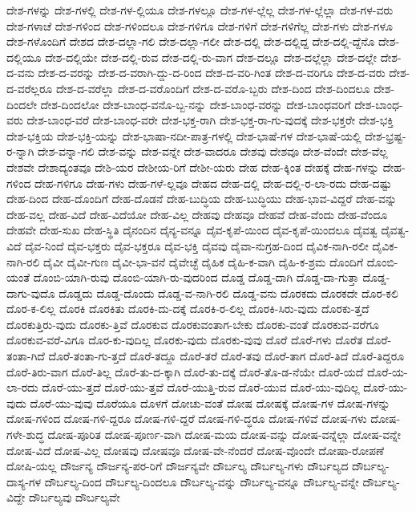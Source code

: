 {ದೇಶ-ಗಳನ್ನು
ದೇಶ-ಗಳಲ್ಲಿ
ದೇಶ-ಗಳ-ಲ್ಲಿಯೂ
ದೇಶ-ಗಳಲ್ಲೂ
ದೇಶ-ಗಳ-ಲ್ಲೆಲ್ಲ
ದೇಶ-ಗಳ-ಲ್ಲೆಲ್ಲಾ
ದೇಶ-ಗಳ-ವರು
ದೇಶ-ಗಳಾಚೆ
ದೇಶ-ಗಳಿಂದ
ದೇಶ-ಗಳಿಂದಲೂ
ದೇಶ-ಗಳಿಗೂ
ದೇಶ-ಗಳಿಗೆ
ದೇಶ-ಗಳಿಗೆಲ್ಲ
ದೇಶ-ಗಳು
ದೇಶ-ಗಳೂ
ದೇಶ-ಗಳೊಂದಿಗೆ
ದೇಶದ
ದೇಶ-ದಲ್ಲಾ-ಗಲಿ
ದೇಶ-ದಲ್ಲಾ-ಗಲೀ
ದೇಶ-ದಲ್ಲಿ
ದೇಶ-ದಲ್ಲಿದ್ದ
ದೇಶ-ದಲ್ಲಿ-ದ್ದೆನೊ
ದೇಶ-ದಲ್ಲಿಯೂ
ದೇಶ-ದಲ್ಲಿಯೇ
ದೇಶ-ದಲ್ಲಿ-ರುವ
ದೇಶ-ದಲ್ಲಿ-ರು-ವಾಗ
ದೇಶ-ದಲ್ಲೂ
ದೇಶ-ದಲ್ಲೆಲ್ಲಾ
ದೇಶ-ದಲ್ಲೇ
ದೇಶ-ದ-ವನು
ದೇಶ-ದ-ವರನ್ನು
ದೇಶ-ದ-ವರಾಗಿ-ದ್ದು-ದ-ರಿಂದ
ದೇಶ-ದ-ವರಿ-ಗಿಂತ
ದೇಶ-ದ-ವರಿಗೂ
ದೇಶ-ದ-ವರು
ದೇಶ-ದ-ವರೆಲ್ಲರೂ
ದೇಶ-ದ-ವರೆಲ್ಲಾ
ದೇಶ-ದ-ವರೊಂದಿಗೆ
ದೇಶ-ದ-ವರೊ-ಬ್ಬರು
ದೇಶ-ದಿಂದ
ದೇಶ-ದಿಂದಲೂ
ದೇಶ-ದಿಂದಲೇ
ದೇಶ-ದಿಂದಲೋ
ದೇಶ-ಬಾಂಧ-ವನೊ-ಬ್ಬ-ನನ್ನು
ದೇಶ-ಬಾಂಧ-ವರನ್ನು
ದೇಶ-ಬಾಂಧವರಿಗೆ
ದೇಶ-ಬಾಂಧ-ವರು
ದೇಶ-ಬಾಂಧ-ವರೆ
ದೇಶ-ಬಾಂಧ-ವರೇ
ದೇಶ-ಭಕ್ತ-ರಾಗಿ
ದೇಶ-ಭಕ್ತ-ರಾ-ಗು-ವುದಕ್ಕೆ
ದೇಶ-ಭಕ್ತರೇ
ದೇಶ-ಭಕ್ತಿ
ದೇಶ-ಭಕ್ತಿಯ
ದೇಶ-ಭಕ್ತಿ-ಯನ್ನು
ದೇಶ-ಭಾಷಾ-ನದೀ-ಪಾತ್ರ-ಗಳಲ್ಲಿ
ದೇಶ-ಭಾಷೆ-ಗಳ
ದೇಶ-ಭಾಷೆ-ಯಲ್ಲಿ
ದೇಶ-ಭ್ರಷ್ಟ-ರ-ನ್ನಾಗಿ
ದೇಶ-ವನ್ನಾ-ಗಲಿ
ದೇಶ-ವನ್ನು
ದೇಶ-ವನ್ನೇ
ದೇಶ-ವಾದರೂ
ದೇಶವು
ದೇಶವೂ
ದೇಶ-ವೆಂದೇ
ದೇಶ-ವೆಲ್ಲ
ದೇಶವೇ
ದೇಶಾದ್ಯಂತವೂ
ದೇಶಿ-ಯರ
ದೇಶೀಯ-ರಿಗೆ
ದೇಶೀ-ಯರು
ದೇಹ
ದೇಹ-ಕ್ಕಿಂತ
ದೇಹಕ್ಕೆ
ದೇಹ-ಗಳನ್ನು
ದೇಹ-ಗಳಿಂದ
ದೇಹ-ಗಳಿಗೂ
ದೇಹ-ಗಳು
ದೇಹ-ಗಳೆ-ಲ್ಲವೂ
ದೇಹದ
ದೇಹ-ದಲ್ಲಿ
ದೇಹ-ದಲ್ಲಿ-ರ-ಲಾ-ರದು
ದೇಹ-ದಷ್ಟು
ದೇಹ-ದಿಂದ
ದೇಹ-ದೊಂದಿಗೆ
ದೇಹ-ದೊಡನೆ
ದೇಹ-ಬುದ್ಧಿಯ
ದೇಹ-ಬುದ್ಧಿಯು
ದೇಹ-ಭಾವ-ವಿದ್ದರೆ
ದೇಹ-ವನ್ನು
ದೇಹ-ವಲ್ಲ
ದೇಹ-ವಿದೆ
ದೇಹ-ವಿದೆಯೋ
ದೇಹ-ವಿಲ್ಲ
ದೇಹವು
ದೇಹವೂ
ದೇಹವೆ
ದೇಹ-ವೆಂದು
ದೇಹ-ವೆಂದೂ
ದೇಹವೇ
ದೇಹ-ಸುಖ
ದೇಹ-ಸ್ಥಿತಿ
ದೈನಂದಿನ
ದೈನ್ಯ-ವನ್ನೂ
ದೈವ-ಕೃಪೆ-ಯಿಂದ
ದೈವ-ಕೃಪೆ-ಯಿಂದಲೂ
ದೈವತ್ವ
ದೈವತ್ವ-ವಿದೆ
ದೈವ-ನಿಂದೆ
ದೈವ-ಭಕ್ತರು
ದೈವ-ಭಕ್ತರೂ
ದೈವ-ಭಕ್ತಿ
ದೈವವು
ದೈವಾ-ನುಗ್ರಹ-ದಿಂದ
ದೈವಿಕ-ನಾಗಿ-ರಲೀ
ದೈವಿಕ-ನಾಗಿ-ರಲಿ
ದೈವೀ
ದೈವೀ-ಗುಣ
ದೈವೀ-ಭಾ-ವನೆ
ದೈವೇಚ್ಛೆ
ದೈಹಿಕ
ದೈಹಿ-ಕ-ವಾಗಿ
ದೈಹಿ-ಕ-ಶ್ರಮ
ದೊಂದಿಗೆ
ದೊಂಬಿ-ಯಂತೆ
ದೊಂಬಿ-ಯಾಗಿ-ರುವು
ದೊಂಬಿ-ಯಾಗಿ-ರು-ವುದರಿಂದ
ದೊಡ್ಡ
ದೊಡ್ಡ-ದಾಗಿ
ದೊಡ್ಡ-ದಾ-ಗುತ್ತಾ
ದೊಡ್ಡ-ದಾಗು-ವುದೊ
ದೊಡ್ಡದು
ದೊಡ್ಡ-ದೊಂದು
ದೊಡ್ಡ-ವ-ನಾಗಿ-ರಲಿ
ದೊಡ್ಡ-ವನು
ದೊರಕದು
ದೊರಕದೇ
ದೊರ-ಕಲಿ
ದೊರ-ಕ-ಲಿಲ್ಲ
ದೊರಕಿ
ದೊರಕಿತು
ದೊರಕಿ-ದು-ದಕ್ಕೆ
ದೊರಕಿ-ರ-ಲಿಲ್ಲ
ದೊರಕಿ-ಸಿರು-ವುದು
ದೊರಕು-ತ್ತದೆ
ದೊರಕುತ್ತಿರು-ವುದು
ದೊರಕು-ತ್ತಿವೆ
ದೊರಕುವ
ದೊರಕುವಂತಾಗ-ಬೇಕು
ದೊರಕು-ವಂತೆ
ದೊರಕುವ-ವರೆಗೂ
ದೊರಕುವ-ವರೆ-ವಿಗೂ
ದೊರ-ಕು-ವುದಿಲ್ಲ
ದೊರಕು-ವುದು
ದೊರಕು-ವುವು
ದೊರೆ
ದೊರೆ-ಗಳು
ದೊರೆತ
ದೊರೆ-ತಂತಾ-ಗಿದೆ
ದೊರೆ-ತಂತಾ-ಗು-ತ್ತದೆ
ದೊರೆ-ತದ್ದೂ
ದೊರೆ-ತರೆ
ದೊರೆ-ತವು
ದೊರೆ-ತಾಗ
ದೊರೆ-ತಿದೆ
ದೊರೆ-ತಿದ್ದರೂ
ದೊರೆ-ತಿರು-ವಾಗ
ದೊರೆ-ತಿಲ್ಲ
ದೊರೆ-ತು-ದ-ಕ್ಕಾಗಿ
ದೊರೆ-ತು-ದಕ್ಕೆ
ದೊರೆ-ತೊ-ಡ-ನೆಯೇ
ದೊರೆ-ಯದೆ
ದೊರೆ-ಯ-ಲಾ-ರದು
ದೊರೆ-ಯು-ತ್ತದೆ
ದೊರೆ-ಯು-ತ್ತವೆ
ದೊರೆ-ಯುತ್ತಿ-ರುವ
ದೊರೆ-ಯುವ
ದೊರೆ-ಯು-ವುದಿಲ್ಲ
ದೊರೆ-ಯು-ವುದು
ದೊರೆ-ಯು-ವುವು
ದೊರೆಯೂ
ದೊಳಗೆ
ದೋಚು-ವಂತೆ
ದೋಷ
ದೋಷಕ್ಕೆ
ದೋಷ-ಗಳ
ದೋಷ-ಗಳನ್ನು
ದೋಷ-ಗಳಿಂದ
ದೋಷ-ಗಳಿ-ದ್ದರೂ
ದೋಷ-ಗಳಿ-ದ್ದರೆ
ದೋಷ-ಗಳಿ-ದ್ಧರೂ
ದೋಷ-ಗಳಿವೆ
ದೋಷ-ಗಳು
ದೋಷ-ಗಳೇ-ಶುದ್ಧ
ದೋಷ-ಪೂರಿತ
ದೋಷ-ಪೂರ್ಣ-ವಾಗಿ
ದೋಷ-ಮಯ
ದೋಷ-ವನ್ನು
ದೋಷ-ವನ್ನೆಲ್ಲಾ
ದೋಷ-ವನ್ನೇ
ದೋಷ-ವಿದೆ
ದೋಷ-ವಿಲ್ಲ
ದೋಷವು
ದೋಷವೂ
ದೋಷ-ವೇ-ನೆಂದರೆ
ದೋಷ-ವೊಂದೇ
ದೋಷಾ-ರೋಪಣೆ
ದೋಷಿ-ಯಲ್ಲ
ದೌರ್ಜನ್ಯ
ದೌರ್ಜನ್ಯ-ಪರ-ರಿಗೆ
ದೌರ್ಜನ್ಯವೇ
ದೌರ್ಬಲ್ಯ
ದೌರ್ಬಲ್ಯ-ಗಳು
ದೌರ್ಬಲ್ಯದ
ದೌರ್ಬಲ್ಯ-ದಾಸ್ಯ-ಗಳ
ದೌರ್ಬಲ್ಯ-ದಿಂದ
ದೌರ್ಬಲ್ಯ-ದಿಂದಲೂ
ದೌರ್ಬಲ್ಯ-ವನ್ನು
ದೌರ್ಬಲ್ಯ-ವನ್ನೂ
ದೌರ್ಬಲ್ಯ-ವನ್ನೇ
ದೌರ್ಬಲ್ಯ-ವಿದ್ದೇ
ದೌರ್ಬಲ್ಯವು
ದೌರ್ಬಲ್ಯವೇ
}
